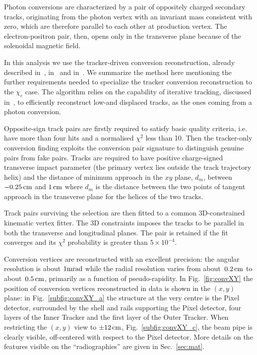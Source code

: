 \documentclass[a4paper]{jpconf}
\begin{document}
Photon conversions are characterized by a pair of
oppositely charged secondary tracks, originating from the photon vertex with an
invariant mass consistent with zero,  which are therefore parallel
to each other at production vertex. The electron-positron pair, then,
opens only in the transverse plane because of the solenoidal magnetic field.



In this analysis we use the tracker-driven conversion reconstruction,
already described in~\cite{TRK-10-001}, in~\cite{trk10001} and in~\cite{TRK-10-003}. We
summarize the method here mentioning the further requirements needed to  
specialize the tracker conversion reconstruction to the $\chi_c$
case. The algorithm relies on the capability of iterative tracking,
discussed in~\cite{TRK-10-001}, to efficiently reconstruct low-\pt and
displaced tracks, as the ones coming from a photon conversion.

Opposite-sign track pairs are firstly required to satisfy basic
quality criteria, i.e. have more than four hits and a normalised
$\chi^2$ less than 10. Then
the tracker-only conversion finding exploits the conversion pair
signature to distinguish genuine pairs from fake pairs.
Tracks are required to have positive charge-signed transverse impact
parameter (the primary vertex lies outside the track trajectory helix)
and the distance of minimum approach in the $xy$ plane, $d_m$, between $-0.25\rm \, cm$
and $1\rm \, cm$ where $d_m$ is
the distance between the two points of tangent approach in the
transverse plane for the helices of the two tracks.




Track pairs surviving the selection are then fitted to a common
3D-constrained kinematic vertex fitter. The 3D constraints imposes the
tracks to be parallel in both the transverse and longitudinal planes.
The pair is retained if the fit converges and its $\chi^2$ probability
is greater than $5\times10^{-4}$.



Conversion vertices are reconstructed with an excellent precision:
the angular resolution is about $1{\rm mrad}$ while the radial resolution varies from about~$0.2\rm \, cm$ to about~$0.5\rm \, cm$, primarily
as a function of pseudo-rapidity.
In Fig.~\ref{fig:convXY} the position of conversion vertices reconstructed in data is shown in the $(x,y)$ plane:
in Fig.~\ref{subfig:convXY_a} the structure at the very centre is the Pixel detector,
surrounded by the shell and rails supporting the Pixel detector, four layers of the Inner Tracker and the first layer of the Outer Tracker.
When restricting the $(x,y)$ view to $\pm 12\rm \, cm$, Fig.~\ref{subfig:convXY_c}, the beam pipe is clearly visible, off-centered with respect to
the Pixel detector. More details on the features visible on the ``radiographies'' are given in Sec.~\ref{sec:mat}.
\end{document}
